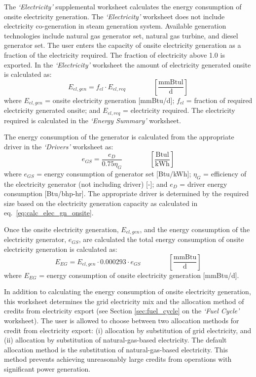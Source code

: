 \documentclass[11pt]{report}
\newcommand{\sheet}[1]{\textit{`{#1}'}}
\newcommand{\eqnunitfrac}[2]{\quad\quad \scriptstyle{\left[\frac{\text{#1}}{\text{#2}}\right]}}
\begin{document}
The \sheet{Electricity} supplemental worksheet calculates the energy consumption of onsite electricity generation. The \sheet{Electricity} worksheet does not include electricity co-generation in steam generation system. Available generation technologies include natural gas generator set, natural gas turbine, and diesel generator set. The user enters the capacity of onsite electricity generation as a fraction of the electricity required. The fraction of electricity above 1.0 is exported. In the \sheet{Electricity} worksheet the amount of electricity generated onsite is calculated as:
\begin{equation} \label{eq:calc_elec_gn_onsite}
E_{el,gen} = f_{el} \cdot E_{el,req}  \quad\quad\eqnunitfrac{mmBtul}{d}
\end{equation}
where $E_{el,gen}$ = onsite electricity generation [mmBtu/d]; $f_{el}$ = fraction of required electricity generated onsite; and $E_{el,req}$ = electricity required. The electricity required is calculated in the \sheet{Energy Summary} worksheet.

The energy consumption of the generator is calculated from the appropriate driver in the \sheet{Drivers} worksheet as:
\begin{equation}
e_{GS} = \frac{e_{D}}{0.75 \eta_{G} } \quad\quad\eqnunitfrac{Btul}{kWh}
\end{equation}
where $e_{GS}$ = energy consumption of generator set [Btu/kWh]; $\eta_{G}$ = efficiency of the electricity generator (not including driver) [-]; and $e_{D}$ = driver energy consumption [Btu/bhp-hr]. The appropriate driver is determined by the required size based on the electricity generation capacity as calculated in eq.\ \eqref{eq:calc_elec_gn_onsite}.


Once the onsite electricity generation, $E_{el,gen}$, and the energy consumption of the electricity generator, $e_{GS}$, are calculated the total energy consumption of onsite electricity generation is calculated as:
\begin{equation}
E_{EG} = E_{el,gen} \cdot 0.000293 \cdot e_{GS} \quad\quad\eqnunitfrac{mmBtu}{d}
\end{equation}
where $E_{EG}$ = energy consumption of onsite electricity generation [mmBtu/d].

In addition to calculating the energy consumption of onsite electricity generation, this worksheet determines the grid electricity mix and the allocation method of credits from electricity export (see Section \ref{sec:fuel_cycle} on the \sheet{Fuel Cycle} worksheet). The user is allowed to choose between two allocation methods for credit from electricity export: (i) allocation by substitution of grid electricity, and (ii) allocation by substitution of natural-gas-based electricity. The default allocation method is the substitution of natural-gas-based electricity. This method prevents achieving unreasonably large credits from operations with significant power generation. 
\end{document}
